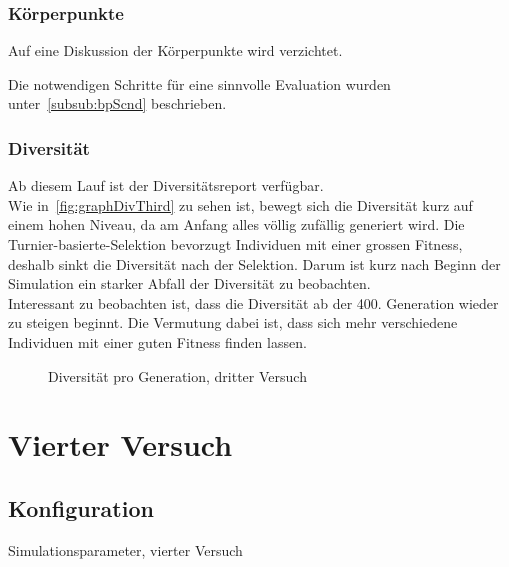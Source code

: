       \subsubsection{Körperpunkte}

        Auf eine Diskussion der Körperpunkte wird verzichtet.


        Die notwendigen Schritte für eine sinnvolle Evaluation wurden unter~\vref{subsub:bpScnd} beschrieben.

      \subsubsection{Diversität}

        Ab diesem Lauf ist der Diversitätsreport verfügbar. %
        \\
        Wie in~\vref{fig:graphDivThird} zu sehen ist, bewegt sich die Diversität kurz auf einem hohen Niveau,
        da am Anfang alles völlig zufällig generiert wird.
        Die Turnier-basierte-Selektion bevorzugt Individuen mit einer grossen Fitness,
        deshalb sinkt die Diversität nach der Selektion.
        Darum ist kurz nach Beginn der Simulation ein starker Abfall der Diversität zu beobachten.
        \\
        Interessant zu beobachten ist, dass die Diversität ab der 400. Generation wieder zu steigen beginnt.
        Die Vermutung dabei ist, dass sich mehr verschiedene Individuen mit einer guten Fitness finden lassen.

        \begin{figure}[H]
          \centering
          
          \caption{Diversität pro Generation, dritter Versuch\label{fig:graphDivThird}}
        \end{figure}

  \section{Vierter Versuch}

    \subsection{Konfiguration}

      \begin{table}[H]
        \centering
        
        \caption{Simulationsparameter, vierter Versuch\label{tbl:forthRunConf}}
      \end{table}

